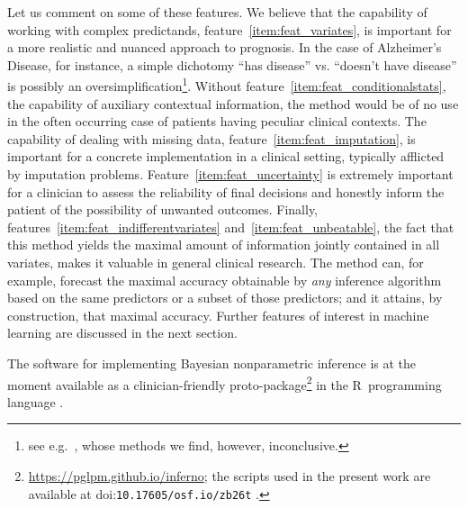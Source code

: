 \documentclass[a4paper,12pt,%
onecolumn,oneside,article,%
british%
]{memoir}
\theoremstyle{remark}
\theoremstyle{innote}
\providecommand{\href}[2]{#2}
\newcommand*{\doi}[1]{%
\href{https://doi.org/#1}{doi:\allowbreak\nolinkurl{#1}}%
}
\renewcommand*{\|}[1][]{\nonscript\:#1\vert\nonscript\:\mathopen{}}
\newcommand*{\eg}{{e.g.}}
\newcommand*{\ad}{Alzheimer's Disease}
\begin{document}
Let us comment on some of these features. We believe that the capability of working with complex predictands, feature~\ref{item:feat_variates}, is important for a more realistic and nuanced approach to prognosis. In the case of \ad, for instance, a simple dichotomy \enquote{has disease} vs. \enquote{doesn't have disease} is possibly an oversimplification\footnote{see \eg\ \cites{edmondsetal2015,edmondsetal2020}, whose methods we find, however, inconclusive.}.
Without feature~\ref{item:feat_conditionalstats}, the capability of auxiliary contextual information, the method would be of no use in the often occurring case of patients having peculiar clinical contexts. The capability of dealing with missing data, feature~\ref{item:feat_imputation}, is important for a concrete implementation in a clinical setting, typically afflicted by imputation problems. Feature~\ref{item:feat_uncertainty} is extremely important for a clinician to assess the reliability of final decisions and honestly inform the patient of the possibility of unwanted outcomes. Finally, features~\ref{item:feat_indifferentvariates} and~\ref{item:feat_unbeatable}, the fact that this method yields the maximal amount of information jointly contained in all variates, makes it valuable in general clinical research. The method can, for example, forecast the maximal accuracy obtainable by \emph{any} inference algorithm based on the same predictors or a subset of those predictors; and it attains, by construction, that maximal accuracy. Further features of interest in machine learning are discussed in the next section.

The software for implementing Bayesian nonparametric inference is at the moment available as a clinician-friendly proto-package\footnote{\url{https://pglpm.github.io/inferno}; the scripts used in the present work are available at \doi{10.17605/osf.io/zb26t}.} in the R~programming language \autocites{rcoreteam1995_r2023}.
\end{document}
